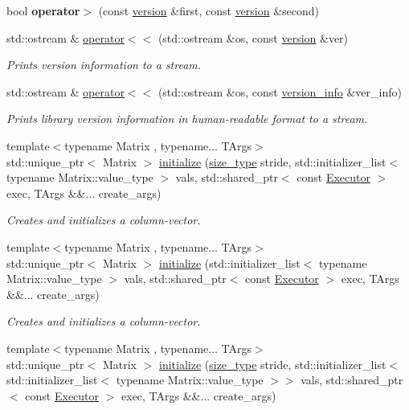\begin{DoxyCompactItemize}
bool {\bfseries operator$>$} (const \hyperlink{structgko_1_1version}{version} \&first, const \hyperlink{structgko_1_1version}{version} \&second)
\item 
std\+::ostream \& \hyperlink{namespacegko_ae0ef652f487afe43aebcf778038ff780}{operator$<$$<$} (std\+::ostream \&os, const \hyperlink{structgko_1_1version}{version} \&ver)
\begin{DoxyCompactList}\small\item\em Prints version information to a stream. \end{DoxyCompactList}\item 
std\+::ostream \& \hyperlink{namespacegko_ad9e3ba96a10fe47a03ceef39b45bd43c}{operator$<$$<$} (std\+::ostream \&os, const \hyperlink{classgko_1_1version__info}{version\+\_\+info} \&ver\+\_\+info)
\begin{DoxyCompactList}\small\item\em Prints library version information in human-\/readable format to a stream. \end{DoxyCompactList}\item 
{\footnotesize template$<$typename Matrix , typename... T\+Args$>$ }\\std\+::unique\+\_\+ptr$<$ Matrix $>$ \hyperlink{group__LinOp_ga2f54bac1e95fb3ef03974fa9c9088491}{initialize} (\hyperlink{namespacegko_a6e5c95df0ae4e47aab2f604a22d98ee7}{size\+\_\+type} stride, std\+::initializer\+\_\+list$<$ typename Matrix\+::value\+\_\+type $>$ vals, std\+::shared\+\_\+ptr$<$ const \hyperlink{classgko_1_1Executor}{Executor} $>$ exec, T\+Args \&\&... create\+\_\+args)
\begin{DoxyCompactList}\small\item\em Creates and initializes a column-\/vector. \end{DoxyCompactList}\item 
{\footnotesize template$<$typename Matrix , typename... T\+Args$>$ }\\std\+::unique\+\_\+ptr$<$ Matrix $>$ \hyperlink{group__LinOp_gaac5f7b4ff3b43dbc6918c687dd7d2d2e}{initialize} (std\+::initializer\+\_\+list$<$ typename Matrix\+::value\+\_\+type $>$ vals, std\+::shared\+\_\+ptr$<$ const \hyperlink{classgko_1_1Executor}{Executor} $>$ exec, T\+Args \&\&... create\+\_\+args)
\begin{DoxyCompactList}\small\item\em Creates and initializes a column-\/vector. \end{DoxyCompactList}\item 
{\footnotesize template$<$typename Matrix , typename... T\+Args$>$ }\\std\+::unique\+\_\+ptr$<$ Matrix $>$ \hyperlink{group__LinOp_gaaf2520e5921e1bea00853c290f4fc28f}{initialize} (\hyperlink{namespacegko_a6e5c95df0ae4e47aab2f604a22d98ee7}{size\+\_\+type} stride, std\+::initializer\+\_\+list$<$ std\+::initializer\+\_\+list$<$ typename Matrix\+::value\+\_\+type $>$$>$ vals, std\+::shared\+\_\+ptr$<$ const \hyperlink{classgko_1_1Executor}{Executor} $>$ exec, T\+Args \&\&... create\+\_\+args)
$$
\end{DoxyCompactItemize}
